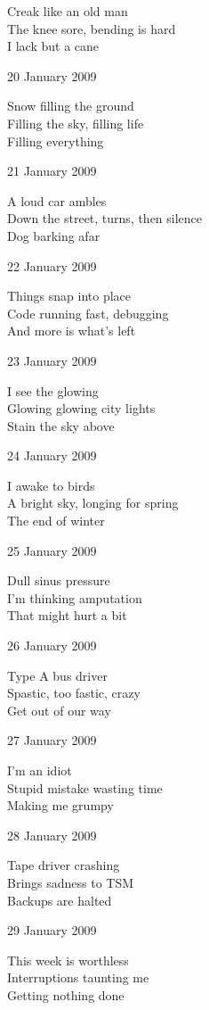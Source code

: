 \documentclass[12pt]{article}
\begin{document}
Creak like an old man \\
The knee sore, bending is hard \\
I lack but a cane

20 January 2009

Snow filling the ground \\
Filling the sky, filling life \\
Filling everything

21 January 2009

A loud car ambles \\
Down the street, turns, then silence \\
Dog barking afar

22 January 2009

Things snap into place \\
Code running fast, debugging \\
And more is what's left

23 January 2009

I see the glowing \\
Glowing glowing city lights \\
Stain the sky above


24 January 2009

I awake to birds \\
A bright sky, longing for spring \\
The end of winter

\newpage

25 January 2009

Dull sinus pressure \\
I'm thinking amputation \\
That might hurt a bit

26 January 2009

Type A bus driver \\
Spastic, too fastic, crazy \\
Get out of our way

27 January 2009

I'm an idiot \\
Stupid mistake wasting time \\
Making me grumpy

28 January 2009

Tape driver crashing \\
Brings sadness to TSM \\
Backups are halted

29 January 2009

This week is worthless \\
Interruptions taunting me \\
Getting nothing done
\end{document}
